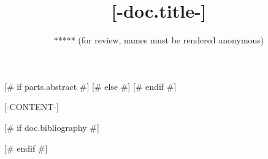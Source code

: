 \documentclass{isprs} %
\begin{document}
\title{[-doc.title-]}
\date{}


\author{***** (for review, names must be rendered anonymous)}

\address{**** (for review, affiliations must be rendered anonymous)}



\icwg{}   %

[# if parts.abstract #]
[# else #]
[# endif #]


\maketitle


[-CONTENT-]

[# if doc.bibliography #]
{
	\begin{spacing}{1.17}
		\normalsize
	\end{spacing}
}
[# endif #]
\end{document}
